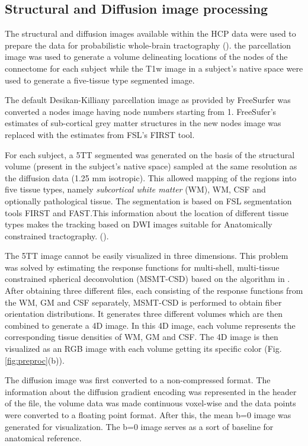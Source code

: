 \documentclass[msthesis.tex]{subfiles}
\begin{document}
\subsection{Structural  and Diffusion image processing}
\label{subsec:struct_diff}

The structural and diffusion images available within the HCP data were used to prepare the data for probabilistic whole-brain tractography (\cite{parker2003framework}). the parcellation image was used to generate a volume delineating locations of the nodes of the connectome for each subject while the T1w image in a subject's native space were used to generate a five-tissue type segmented image.

The default Desikan-Killiany parcellation image as provided by FreeSurfer was converted a nodes image having node numbers starting from 1. FreeSufer's estimates of sub-cortical grey matter structures in the new nodes image was replaced with the estimates from FSL's FIRST tool. 

For each subject, a 5TT segmented was generated on the basis of the structural volume (present in the subject's native space) sampled at the same resolution as the diffusion data (1.25 mm isotropic). This allowed mapping of the regions into five tissue types, namely \textit{subcortical white matter} (WM), WM, CSF and optionally pathological tissue. The segmentation is based on FSL segmentation tools FIRST and FAST.This information about the location of different tissue types makes the tracking based on DWI images suitable for Anatomically constrained tractography.  (\cite{anattractsmith}).

The 5TT image cannot be easily visualized in three dimensions. This problem was solved by estimating the response functions for multi-shell, multi-tissue constrained spherical deconvolution (MSMT-CSD)  based on the algorithm in \cite{jeurissen2014multi}. After obtaining three different files, each consisting of the response functions from the WM, GM and CSF separately, MSMT-CSD is performed to obtain fiber orientation distributions. It generates three different volumes which are then combined to generate a 4D image. In this 4D image, each volume represents the corresponding tissue densities of WM, GM and CSF. The 4D image is then visualized as an RGB image with each volume getting its specific color (Fig. \ref{fig:preproc}(b)). 


\iffalse
The diffusion image was first converted to a non-compressed format. The information about the diffusion gradient encoding was represented in the header of the file, the volume data was made continuous voxel-wise and the data points were converted to a floating point format. 
After this, the mean b=0 image was generated for visualization. The b=0 image serves as a sort of baseline for anatomical reference.
\end{document}
